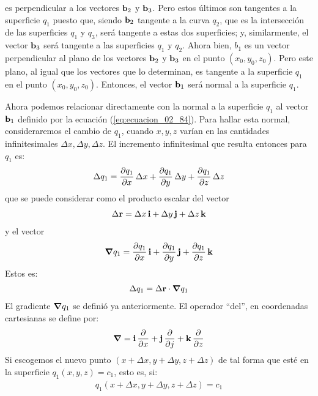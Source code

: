 \documentclass[12pt]{article}
\begin{document}
es perpendicular a los vectores $\vb{b}_{2}$ y $\vb{b}_{3}$. Pero estos últimos son tangentes a la superficie $q_{1}$ puesto que, siendo $\vb{b}_{2}$ tangente a la curva $q_{2}$, que es la intersección de las superficies $q_{1}$ y $q_{3}$, será tangente a estas dos superficies; y, similarmente, el vector $\vb{b}_{3}$ será tangente a las superficies $q_{1}$ y $q_{2}$. Ahora bien, $b_{1}$ es un vector perpendicular al plano de los vectores $\vb{b}_{2}$ y $\vb{b}_{3}$ en el punto $( x_{0}, y_{0}, z_{0})$. Pero este plano, al igual que los vectores que lo determinan, es tangente a la superficie $q_{1}$ en el punto $(x_{0}, y_{0}, z_{0})$. Entonces, el vector $\vb{b}_{1}$ será normal a la superficie $q_{1}$.
\par
Ahora podemos relacionar directamente con la normal a la superficie $q_{1}$ al vector $\vb{b}_{1}$ definido por la ecuación (\ref{eq:ecuacion_02_84}). Para hallar esta normal, consideraremos el cambio de $q_{1}$, cuando $x, y, z$ varían en las cantidades infinitesimales $\Delta x, \Delta y, \Delta z$. El incremento infinitesimal que resulta entonces para $q_{1}$ es:
\begin{align}
    \Delta q_{1} = \pdv{q_{1}}{x} \, \Delta x + \pdv{q_{1}}{y} \, \Delta y + \pdv{q_{1}}{z} \, \Delta z
    \label{eq:ecuacion_02_85}
\end{align} 
que se puede considerar como el producto escalar del vector
\begin{align}
    \Delta \vb{r} = \Delta x \, \vb{i} + \Delta y \, \vb{j} + \Delta z \, \vb{k}
    \label{eq:ecuacion_02_86}
\end{align}
y el vector
\begin{align}
    \grad{q_{1}} = \pdv{q_{1}}{x} \, \vb{i} + \pdv{q_{1}}{y} \, \vb{j} + \pdv{q_{1}}{z} \, \vb{k}
    \label{eq:ecuacion_02_87}
\end{align}
Estos es:
\begin{align}
    \Delta q_{1} = \Delta \vb{r} \cdot \grad{q_{1}}
    \label{eq:ecuacion_02_88}
\end{align}
El gradiente $\grad{q_{1}}$ se definió ya anteriormente. El operador \enquote{del}, en coordenadas cartesianas se define por:
\begin{align}
    \grad = \vb{i} \, \pdv{x} + \vb{j} \, \pdv{j} + \vb{k} \, \pdv{z}
    \label{ec:ecuacion_02_89}
\end{align}
Si escogemos el nuevo punto $(x + \Delta x, y + \Delta y, z + \Delta z)$ de tal forma que esté en la superficie $q_{1} (x, y, z) = c_{1}$, esto es, si:
\begin{align*}
    q_{1} \left( x + \Delta x, y + \Delta y, z + \Delta z \right) = c_{1}
\end{align*}
\end{document}
